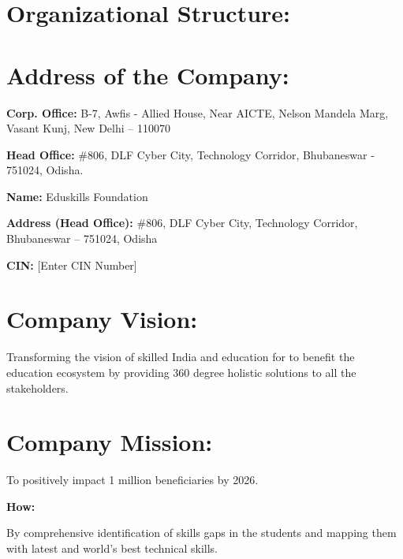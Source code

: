 \documentclass[12pt, a4paper, oneside]{report}
\begin{document}
\section{Organizational Structure:}


\section{Address of the Company:}

\noindent \textbf{Corp. Office:} B-7, Awfis - Allied House, Near AICTE, Nelson Mandela Marg, 
Vasant Kunj, New Delhi -- 110070

\noindent \textbf{Head Office:} \#806, DLF Cyber City, Technology Corridor, 
Bhubaneswar - 751024, Odisha.

\noindent \textbf{Name:} Eduskills Foundation

\noindent \textbf{Address (Head Office):} \#806, DLF Cyber City, Technology Corridor, 
Bhubaneswar -- 751024, Odisha

\noindent \textbf{CIN:} [Enter CIN Number]

\section{Company Vision:}

Transforming the vision of skilled India and education for to benefit the education 
ecosystem by providing 360 degree holistic solutions to all the stakeholders.

\section{Company Mission:}

To positively impact 1 million beneficiaries by 2026.

\medskip
\noindent \textbf{How:}

By comprehensive identification of skills gaps in the students and mapping them with 
latest and world's best technical skills.


\end{document}
